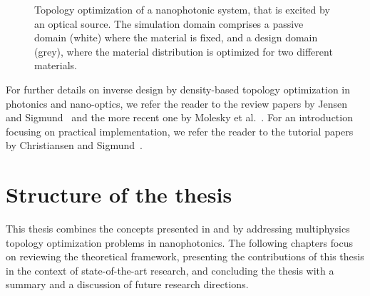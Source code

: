 \begin{figure}[tb]
    \centering
    \caption{Topology optimization of a nanophotonic system, that is excited by an optical source. The simulation domain comprises a passive domain (white) where the material is fixed, and a design domain (grey), where the material distribution is optimized for two different materials.}
        \label{fig:top_opt}
\end{figure}

For further details on inverse design by density-based topology optimization in photonics and nano-optics, we refer the reader to
the review papers by Jensen and Sigmund~\cite{jensen_review} and the more recent one by Molesky et al.~\cite{Molesky_2018}. 
For an introduction focusing on practical implementation, we refer the reader to the tutorial papers by Christiansen and Sigmund~\cite{tutorial_matlab, tutorial_COMSOL}.

\section{Structure of the thesis}

This thesis combines the concepts presented in  and  by addressing multiphysics topology optimization problems in nanophotonics. The following chapters focus on reviewing
 the theoretical framework, presenting the contributions of this thesis in the context of state-of-the-art research,
  and concluding the thesis with a summary and a discussion of future research directions.

